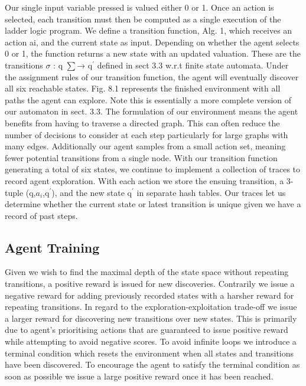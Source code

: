 \documentclass[runningheads]{llncs}
\begin{document}
Our single input variable pressed is valued either 0 or 1. Once an action is selected, each
transition must then be computed as a single execution of the ladder logic program. We
define a transition function, Alg. 1, which receives an action ai, and the current state as
input. Depending on whether the agent selects 0 or 1, the function returns a new state
with an updated valuation. These are the transitions $\sigma$ : q $\sum$→ q$^{\prime}$ defined in sect 3.3 w.r.t
finite state automata. Under the assignment rules of our transition function, the agent will
eventually discover all six reachable states. Fig. 8.1 represents the finished environment
with all paths the agent can explore. Note this is essentially a more complete version of
our automaton in sect. 3.3. The formulation of our environment means the agent benefits
from having to traverse a directed graph. This can often reduce the number of decisions to
consider at each step particularly for large graphs with many edges. Additionally our agent
samples from a small action set, meaning fewer potential transitions from a single node. With our transition function generating a total of six states, we continue to implement
a collection of traces to record agent exploration. With each action we store the ensuing
transition, a 3-tuple (q,$a_{i}$,q$^{\prime}$), and the new state q$^{\prime}$ in separate hash tables. Our traces let us determine whether the current state or latest transition is unique given we have
a record of past steps.



\subsection{Agent Training}
Given we wish to find the maximal depth of the state space without repeating transitions,
a positive reward is issued for new discoveries. Contrarily we issue a negative reward
for adding previously recorded states with a harsher reward for repeating transitions. In
regard to the exploration-exploitation trade-off we issue a larger reward for discovering
new transitions over new states. This is primarily due to agent’s prioritising actions that
are guaranteed to issue positive reward while attempting to avoid negative scores. To avoid
infinite loops we introduce a terminal condition which resets the environment when all
states and transitions have been discovered. To encourage the agent to satisfy the terminal
condition as soon as possible we issue a large positive reward once it has been reached.
\end{document}
